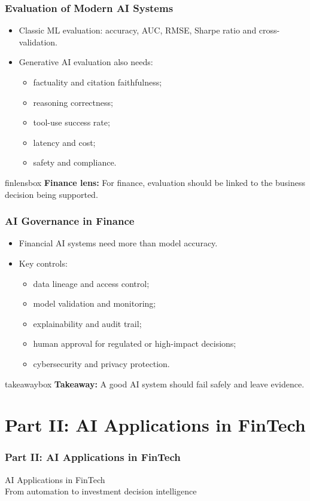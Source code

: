\documentclass[aspectratio=169,12pt]{beamer}
\newcommand{\currentframetitle}{}
\newcommand{\slideTitle}[1]{\gdef\currentframetitle{#1}\frametitle{#1}}
\newcommand{\finlens}[1]{%
  \vspace{0.08cm}
  \begin{beamercolorbox}[wd=\linewidth,rounded=true,sep=0.18cm]{finlensbox}
    \small\textbf{Finance lens:} #1
  \end{beamercolorbox}%
}
\newcommand{\takeaway}[1]{%
  \vspace{0.08cm}
  \begin{beamercolorbox}[wd=\linewidth,rounded=true,sep=0.18cm]{takeawaybox}
    \small\textbf{Takeaway:} #1
  \end{beamercolorbox}%
}
\begin{document}
\begin{frame}
\slideTitle{Evaluation of Modern AI Systems}
\begin{itemize}
  \item Classic ML evaluation: accuracy, AUC, RMSE, Sharpe ratio and cross-validation.
  \item Generative AI evaluation also needs:
  \begin{itemize}
    \item factuality and citation faithfulness;
    \item reasoning correctness;
    \item tool-use success rate;
    \item latency and cost;
    \item safety and compliance.
  \end{itemize}
\end{itemize}
\finlens{For finance, evaluation should be linked to the business decision being supported.}
\end{frame}

\begin{frame}
\slideTitle{AI Governance in Finance}
\begin{itemize}
  \item Financial AI systems need more than model accuracy.
  \item Key controls:
  \begin{itemize}
    \item data lineage and access control;
    \item model validation and monitoring;
    \item explainability and audit trail;
    \item human approval for regulated or high-impact decisions;
    \item cybersecurity and privacy protection.
  \end{itemize}
\end{itemize}
\takeaway{A good AI system should fail safely and leave evidence.}
\end{frame}

\section{Part II: AI Applications in FinTech}

\begin{frame}
\slideTitle{Part II: AI Applications in FinTech}
\vspace{1.0cm}
\begin{center}
{\Huge AI Applications in FinTech}\\[0.35cm]
{\Large From automation to investment decision intelligence}
\end{center}
\end{frame}
\end{document}
